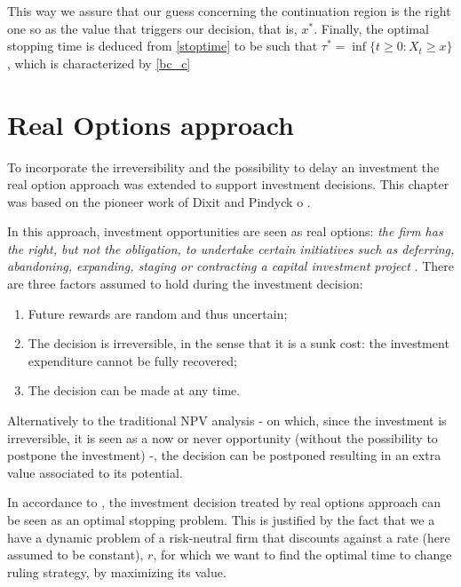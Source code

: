 This way we assure that our guess concerning the continuation region is the right one so as the value that triggers our decision, that is, $x^*$. Finally, the optimal stopping time is deduced from \eqref{stoptime} to be such that $\tau^*= \inf \{ t \geq 0: X_t \geq x \}$, which is characterized by \eqref{bc_c}




\section{Real Options approach}
\label{bc_ro}


To incorporate the irreversibility and the possibility to delay an investment the real option approach was extended to support investment decisions. This chapter was based on the pioneer work of Dixit and Pindyck o \cite{dixit:book}.

In this approach, investment opportunities are seen as real options: \textit{the firm has the right, but not the obligation, to undertake certain initiatives such as deferring, abandoning, expanding, staging or contracting a capital investment project} \cite{corp:book}. There are three factors assumed to hold during the investment decision:
\begin{enumerate}
	\item Future rewards are random and thus uncertain;
	\item The decision is irreversible, in the sense that it is a sunk cost: the investment expenditure cannot be fully recovered;
	\item The decision can be made at any time.
\end{enumerate}


Alternatively to the traditional NPV analysis - on which, since the investment is irreversible, it is seen as a now or never opportunity (without the possibility to postpone the investment) -, the decision can be postponed resulting in an extra value associated to its potential. 

In accordance to \cite{dixit:book}, the investment decision treated by real options approach can be seen as an optimal stopping problem. This is justified by the fact that we a have a dynamic problem of a risk-neutral firm that discounts against a rate (here assumed to be constant), $r$, for which we want to find the optimal time to change ruling strategy, by maximizing its value.


